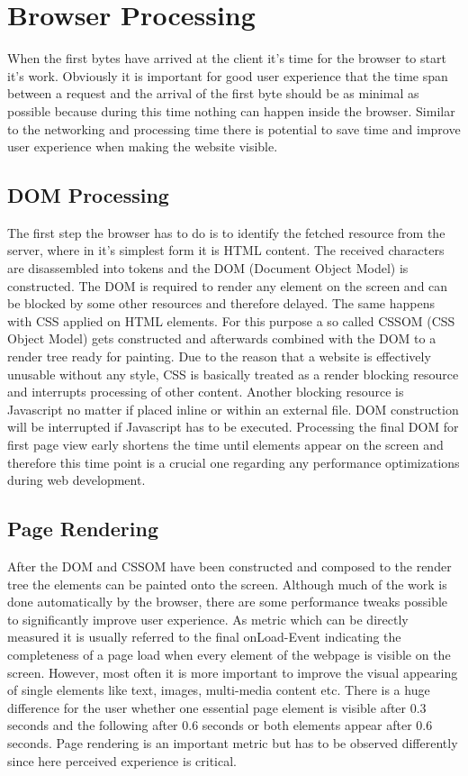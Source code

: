 \section{Browser Processing}

When the first bytes have arrived at the client it's time for the browser to start it's work. Obviously it is important for good user experience that the time span between a request and the arrival of the first byte should be as minimal as possible because during this time nothing can happen inside the browser. Similar to the networking and processing time there is potential to save time and improve user experience when making the website visible. 

\subsection{DOM Processing}
The first step the browser has to do is to identify the fetched resource from the server, where in it's simplest form it is HTML content. The received characters are disassembled into tokens and the DOM (Document Object Model) is constructed. The DOM is required to render any element on the screen and can be blocked by some other resources and therefore delayed. The same happens with CSS applied on HTML elements. For this purpose a so called CSSOM (CSS Object Model) gets constructed and afterwards combined with the DOM to a render tree ready for painting. Due to the reason that a website is effectively unusable without any style, CSS is basically treated as a render blocking resource and interrupts processing of other content. Another blocking resource is Javascript no matter if placed inline or within an external file. DOM construction will be interrupted if Javascript has to be executed. Processing the final DOM for first page view early shortens the time until elements appear on the screen and therefore this time point is a crucial one regarding any performance optimizations during web development. \cite{GoogleDev} 

\subsection{Page Rendering}
After the DOM and CSSOM have been constructed and composed to the render tree the elements can be painted onto the screen. Although much of the work is done automatically by the browser, there are some performance tweaks possible to significantly improve user experience. As metric which can be directly measured it is usually referred to the final onLoad-Event indicating the completeness of a page load when every element of the webpage is visible on the screen. However, most often it is more important to improve the visual appearing of single elements like text, images, multi-media content etc. There is a huge difference for the user whether one essential page element is visible after 0.3 seconds and the following after 0.6 seconds or both elements appear after 0.6 seconds. Page rendering is an important metric but has to be observed differently since here perceived experience is critical. 